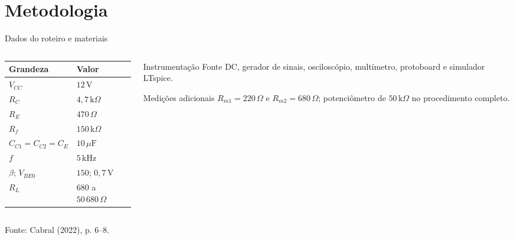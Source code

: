 \documentclass[aspectratio=169,11pt]{beamer}
\begin{document}
\section{Metodologia}


\begin{frame}{Dados do roteiro e materiais}
  \begin{columns}[T,onlytextwidth]
    \begin{column}{0.52\textwidth}
      \centering\small
      \begin{tabular}{ll}
        \toprule
        \textbf{Grandeza} & \textbf{Valor}\tabularnewline
        \midrule
        $V_{CC}$ & $12\,\mathrm{V}$\\
        $R_C$ & $4{,}7\,\mathrm{k}\Omega$\\
        $R_E$ & $470\,\Omega$\\
        $R_f$ & $150\,\mathrm{k}\Omega$\\
        $C_{C1}=C_{C2}=C_E$ & $10\,\mu\mathrm{F}$\\
        $f$ & $5\,\mathrm{kHz}$\\
        $\beta$; $V_{BE0}$ & $150$; $0{,}7\,\mathrm{V}$\\
        $R_L$ & $680$ a $50\,680\,\Omega$\\
        \bottomrule
      \end{tabular}
    \end{column}
    \begin{column}{0.44\textwidth}
      \begin{block}{Instrumentação}
        \small
        Fonte DC, gerador de sinais, osciloscópio, multímetro,
        protoboard e simulador LTspice.
      \end{block}
      \begin{block}{Medições adicionais}
      \small
       $R_{m1}=220\,\Omega$ e $R_{m2}=680\,\Omega$;
       potenciômetro de $50\,\mathrm{k}\Omega$ no procedimento completo.
      \end{block}
    \end{column}
  \end{columns}
  \vspace{0.2cm}
  {\scriptsize Fonte: Cabral (2022), p. 6--8.}
\end{frame}


\end{document}
